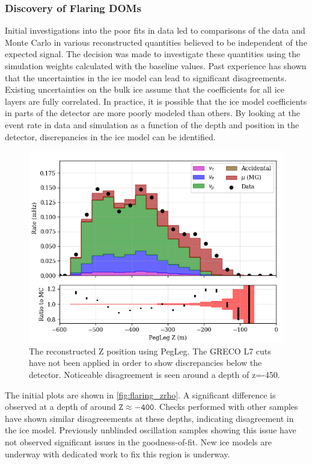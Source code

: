 \subsubsection{Discovery of Flaring DOMs}
Initial investigations into the poor fits in data led to comparisons of the data and Monte Carlo in various reconstructed quantities believed to be independent of the expected signal.
The decision was made to investigate these quantities using the simulation weights calculated with the baseline values.
Past experience has shown that the uncertainties in the ice model can lead to significant disagreements.
Existing uncertainties on the bulk ice assume that the coefficients for all ice layers are fully correlated.
In practice, it is possible that the ice model coefficients in parts of the detector are more poorly modeled than others.
By looking at the event rate in data and simulation as a function of the depth and position in the detector, discrepancies in the ice model can be identified.

\begin{center}
\label{fig:flaring_zrho}
\begin{figure}
	\includegraphics[width=0.6\linewidth]{L7_reco_z.png}
\caption{The reconstructed Z position using PegLeg. The GRECO L7 cuts have not been applied in order to show discrepancies below the detector. Noticeable disagreement is seen around a depth of z=-450.}
\end{figure}
\end{center}

The initial plots are shown in \ref{fig:flaring_zrho}.
A significant difference is observed at a depth of around $\mathtt{Z\approx -400}$.
Checks performed with other samples have shown similar disagreeements at these depths, indicating disagreement in the ice model.
Previously unblinded oscillation samples showing this issue have not observed significant issues in the goodness-of-fit.
New ice models are underway with dedicated work to fix this region is underway.

